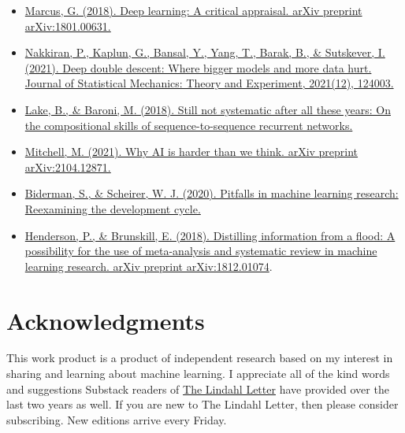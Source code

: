 \documentclass{article}
\begin{document}
\begin{itemize}
\item \href{https://arxiv.org/ftp/arxiv/papers/1801/1801.00631.pdf}{Marcus, G. (2018). Deep learning: A critical appraisal. arXiv preprint arXiv:1801.00631.} \cite{marcus2018deep}
\item \href{https://arxiv.org/pdf/1912.02292.pdf}{Nakkiran, P., Kaplun, G., Bansal, Y., Yang, T., Barak, B., \& Sutskever, I. (2021). Deep double descent: Where bigger models and more data hurt. Journal of Statistical Mechanics: Theory and Experiment, 2021(12), 124003.} \cite{nakkiran2021deep} 
\item \href{https://openreview.net/pdf?id=H18WqugAb}{Lake, B., \& Baroni, M. (2018). Still not systematic after all these years: On the compositional skills of sequence-to-sequence recurrent networks.} \cite{lake2018still}
\item \href{https://arxiv.org/pdf/2104.12871.pdf}{Mitchell, M. (2021). Why AI is harder than we think. arXiv preprint arXiv:2104.12871.} \cite{mitchell2021ai} 
\item \href{http://proceedings.mlr.press/v137/biderman20a/biderman20a.pdf}{Biderman, S., \& Scheirer, W. J. (2020). Pitfalls in machine learning research: Reexamining the development cycle.} \cite{biderman2020pitfalls} 
\item \href{https://arxiv.org/pdf/1812.01074.pdf}{Henderson, P., \& Brunskill, E. (2018). Distilling information from a flood: A possibility for the use of meta-analysis and systematic review in machine learning research. arXiv preprint arXiv:1812.01074}. \cite{henderson2018distilling}
\end{itemize}


\section*{Acknowledgments}
This work product is a product of independent research based on my interest in sharing and learning about machine learning. I appreciate all of the kind words and suggestions Substack readers of \href{https://nelslindahl.substack.com/}{The Lindahl Letter} have provided over the last two years as well. If you are new to The Lindahl Letter, then please consider subscribing. New editions arrive every Friday. 

  
  
\end{document}
